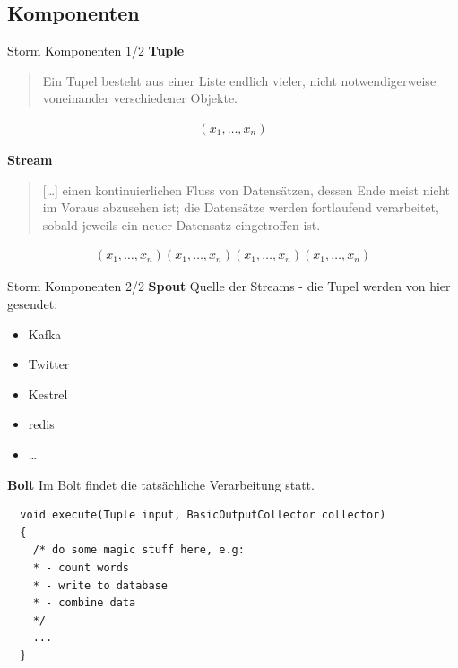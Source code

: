 \documentclass{beamer}
\begin{document}
\subsection{Komponenten}
\begin{frame}[t]{Storm Komponenten 1/2}
  \textbf{Tuple}
  \begin{quote}
    Ein Tupel besteht aus einer Liste endlich vieler, nicht notwendigerweise voneinander verschiedener Objekte.
  \end{quote}
  \setlength{\abovedisplayskip}{-20pt}
  \setlength{\abovedisplayshortskip}{-20pt}
  \begin{align*}
    (x_1, \ldots , x_n)
  \end{align*}

  \pause

  \textbf{Stream}
  \begin{quote}
    [\ldots] einen kontinuierlichen Fluss von Datensätzen, dessen Ende meist nicht im Voraus abzusehen ist; die Datensätze werden fortlaufend verarbeitet, sobald jeweils ein neuer Datensatz eingetroffen ist.
  \end{quote}

  \begin{align*}
    (x_1, \ldots , x_n)
    (x_1, \ldots , x_n)
    (x_1, \ldots , x_n)
    (x_1, \ldots , x_n)
  \end{align*}
  \begin{figure}
    \centering
    \vspace*{-1cm}
  \end{figure}
\end{frame}

\begin{frame}[fragile]{Storm Komponenten 2/2}
  \textbf{Spout}
  Quelle der Streams - die Tupel werden von hier gesendet: 
  \begin{itemize}
    \item Kafka 
    \item Twitter 
    \item Kestrel 
    \item redis
    \item \ldots
  \end{itemize}

  \pause

  \textbf{Bolt}
  Im Bolt findet die tatsächliche Verarbeitung statt.
  \begin{lstlisting}
  void execute(Tuple input, BasicOutputCollector collector)
  {
    /* do some magic stuff here, e.g:
    * - count words
    * - write to database
    * - combine data
    */
    ...
  }

  \end{lstlisting}
\end{frame}
\end{document}
